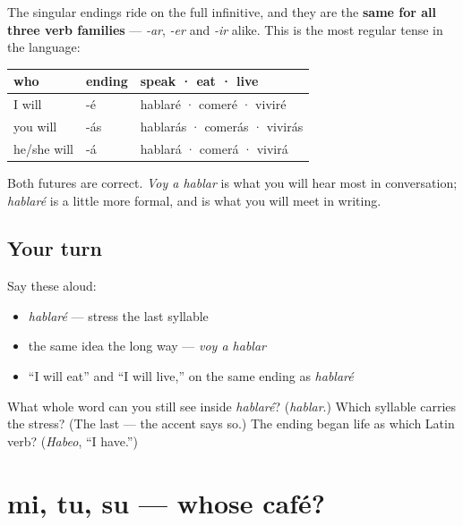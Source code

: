 \begin{grammarlens}[title={What you've built}]
The singular endings ride on the full infinitive, and they are the \textbf{same for all three verb families} — \emph{-ar}, \emph{-er} and \emph{-ir} alike. This is the most regular tense in the language:

\noindent
\begin{tabularx}{\linewidth}{@{}>{\raggedright\arraybackslash}X>{\raggedright\arraybackslash}X>{\raggedright\arraybackslash}X@{}}
\toprule
\textbf{who} & \textbf{ending} & \textbf{speak · eat · live} \\
\midrule
I will & -é & hablaré · comeré · viviré \\
you will & -ás & hablarás · comerás · vivirás \\
he/she will & -á & hablará · comerá · vivirá \\
\bottomrule
\end{tabularx}

Both futures are correct. \emph{Voy a hablar} is what you will hear most in conversation; \emph{hablaré} is a little more formal, and is what you will meet in writing.
\end{grammarlens}

\subsection*{Your turn}
Say these aloud:

\begin{itemize}
\raggedright
  \item \emph{hablaré} — stress the last syllable
  \item the same idea the long way — \emph{voy a hablar}
  \item \textquotedblleft{}I will eat\textquotedblright{} and \textquotedblleft{}I will live,\textquotedblright{} on the same ending as \emph{hablaré}
\end{itemize}

\begin{tcolorbox}[breakable,colback=teal!4,colframe=teal!35!black,title={Before you move on}]
What whole word can you still see inside \emph{hablaré}? (\emph{hablar}.) Which syllable carries the stress? (The last — the accent says so.) The ending began life as which Latin verb? (\emph{Habeo}, \textquotedblleft{}I have.\textquotedblright{})
\end{tcolorbox}
\section[mi, tu, su]{mi, tu, su — whose café?}

